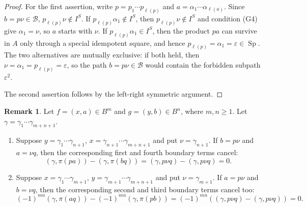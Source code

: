 \documentclass[11pt,a4paper,reqno]{amsart}
\newcommand{\mB}{\mathcal B}
\newcommand{\Sp}{\operatorname{Sp}}
\newcommand{\para}[2]{(#1,#2)}
\theoremstyle{plain}
\theoremstyle{definition}
\newtheorem{remark}[remark]{Remark}
\numberwithin{equation}{section}
\begin{document}
	\begin{proof}
		For the first assertion, write $p=p_1\cdots p_{\ell(p)}$ and $a=\alpha_1\cdots \alpha_{\ell(a)}$.
		Since $b=p\nu\in\mB$,
		$p_{\ell(p)}\nu\notin I^S$.
		If $p_{\ell(p)}\alpha_1\notin I^S$, then
		$p_{\ell(p)}\nu\notin I^S$ and condition \textup{(G4)} give
		$\alpha_1=\nu$, so $a$ starts with $\nu$.  If $p_{\ell(p)}\alpha_1\in I^S$, then the product
		$pa$ can survive in $A$ only through a special idempotent square, and
		hence
		$p_{\ell(p)}=\alpha_1=\varepsilon\in\Sp$.
		The two alternatives are mutually exclusive: if both held, then
		$\nu=\alpha_1=p_{\ell(p)}=\varepsilon$, so the path $b=p\nu\in\mB$
		would contain the forbidden subpath $\varepsilon^2$.
		
		The second assertion follows by the left-right symmetric argument.
	\end{proof}
	\begin{remark}
		\label{rem:higher-boundary-cancellation}
		Let $f=\para{x}{a}\in B^m$ and $g=\para{y}{b}\in B^n$, where $m,n\geq1$.
		Let $\gamma=\gamma_1\cdots\gamma_{m+n+1}$.
		\begin{enumerate}
			\item Suppose $y=\gamma_1\cdots\gamma_{n+1}$, $x=\gamma_{n+1}\cdots\gamma_{m+n+1}$
			and put $\nu=\gamma_{n+1}$.
			If $b=p\nu$ and $a=\nu q$,
			then the corresponding first and fourth boundary terms cancel:
			\[
			\para{\gamma}{\pi(pa)}-\para{\gamma}{\pi(bq)}
			=\para{\gamma}{p\nu q}-\para{\gamma}{p\nu q}=0.
			\]
			
			\item Suppose
			$x=\gamma_1\cdots\gamma_{m+1}$, $y=\gamma_{m+1}\cdots\gamma_{m+n+1}$
			and put $\nu=\gamma_{m+1}$.
			If $a=p\nu$ and $b=\nu q$,
			then the corresponding second and third boundary terms cancel too:
			\[
			(-1)^{mn}\para{\gamma}{\pi(aq)}
			-
			(-1)^{mn}\para{\gamma}{\pi(pb)}
			=(-1)^{mn}(\para{\gamma}{p\nu q}-\para{\gamma}{p\nu q})=0.
			\]
		\end{enumerate}
	\end{remark}
\end{document}
